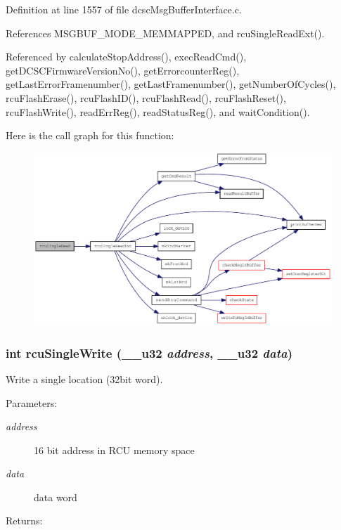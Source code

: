 Definition at line 1557 of file dcsc\-Msg\-Buffer\-Interface.c.

References MSGBUF\_\-MODE\_\-MEMMAPPED, and rcu\-Single\-Read\-Ext().

Referenced by calculate\-Stop\-Address(), exec\-Read\-Cmd(), get\-DCSCFirmware\-Version\-No(), get\-Errorcounter\-Reg(), get\-Last\-Error\-Framenumber(), get\-Last\-Framenumber(), get\-Number\-Of\-Cycles(), rcu\-Flash\-Erase(), rcu\-Flash\-ID(), rcu\-Flash\-Read(), rcu\-Flash\-Reset(), rcu\-Flash\-Write(), read\-Err\-Reg(), read\-Status\-Reg(), and wait\-Condition().

Here is the call graph for this function:\begin{figure}[H]
\begin{center}
\leavevmode
\includegraphics[width=349pt]{group__dcsc__msg__buffer__access_g339b5922513d0f0211d7962234faa24f_cgraph}
\end{center}
\end{figure}
\hypertarget{group__dcsc__msg__buffer__access_g5b2ecab6b0a6383afebde1ea486dae43}{
\subsubsection[rcuSingleWrite]{\setlength{\rightskip}{0pt plus 5cm}int rcu\-Single\-Write (\_\-\_\-u32 {\em address}, \_\-\_\-u32 {\em data})}}
\label{group__dcsc__msg__buffer__access_g5b2ecab6b0a6383afebde1ea486dae43}


Write a single location (32bit word). 

\begin{Desc}
\item[Parameters:]
\begin{description}
\item[{\em address}]16 bit address in RCU memory space \item[{\em data}]data word \end{description}
\end{Desc}
\begin{Desc}
\item[Returns:]\end{Desc}


